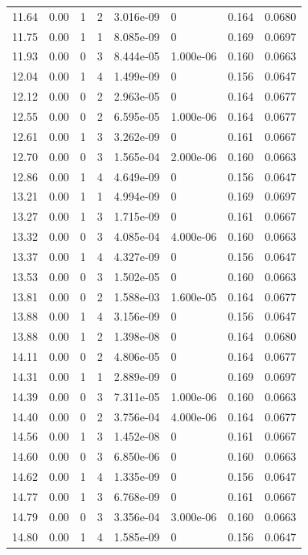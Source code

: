 \documentclass[preview]{standalone}
\begin{document}
{{{\begin{tabular}{L{1.2cm}C{1.2cm} C{0.3cm}C{0.5cm} C{1.4cm}C{1.4cm} C{1.4cm}C{1.4cm}}
  11.64  &  0.00  & 1     &  2 &  3.016e-09  & 0  & 0.164 &  0.0680   \\ 
  11.75  &  0.00  & 1     &  1 &  8.085e-09  & 0  & 0.169 &  0.0697   \\ 
  11.93  &  0.00  & 0     &  3 &  8.444e-05  & 1.000e-06  & 0.160 &  0.0663   \\ 
  12.04  &  0.00  & 1     &  4 &  1.499e-09  & 0  & 0.156 &  0.0647   \\ 
  12.12  &  0.00  & 0     &  2 &  2.963e-05  & 0  & 0.164 &  0.0677   \\ 
  12.55  &  0.00  & 0     &  2 &  6.595e-05  & 1.000e-06  & 0.164 &  0.0677   \\ 
  12.61  &  0.00  & 1     &  3 &  3.262e-09  & 0  & 0.161 &  0.0667   \\ 
  12.70  &  0.00  & 0     &  3 &  1.565e-04  & 2.000e-06  & 0.160 &  0.0663   \\ 
  12.86  &  0.00  & 1     &  4 &  4.649e-09  & 0  & 0.156 &  0.0647   \\ 
  13.21  &  0.00  & 1     &  1 &  4.994e-09  & 0  & 0.169 &  0.0697   \\ 
  13.27  &  0.00  & 1     &  3 &  1.715e-09  & 0  & 0.161 &  0.0667   \\ 
  13.32  &  0.00  & 0     &  3 &  4.085e-04  & 4.000e-06  & 0.160 &  0.0663   \\ 
  13.37  &  0.00  & 1     &  4 &  4.327e-09  & 0  & 0.156 &  0.0647   \\ 
  13.53  &  0.00  & 0     &  3 &  1.502e-05  & 0  & 0.160 &  0.0663   \\ 
  13.81  &  0.00  & 0     &  2 &  1.588e-03  & 1.600e-05  & 0.164 &  0.0677   \\ 
  13.88  &  0.00  & 1     &  4 &  3.156e-09  & 0  & 0.156 &  0.0647   \\ 
  13.88  &  0.00  & 1     &  2 &  1.398e-08  & 0  & 0.164 &  0.0680   \\ 
  14.11  &  0.00  & 0     &  2 &  4.806e-05  & 0  & 0.164 &  0.0677   \\ 
  14.31  &  0.00  & 1     &  1 &  2.889e-09  & 0  & 0.169 &  0.0697   \\ 
  14.39  &  0.00  & 0     &  3 &  7.311e-05  & 1.000e-06  & 0.160 &  0.0663   \\ 
  14.40  &  0.00  & 0     &  2 &  3.756e-04  & 4.000e-06  & 0.164 &  0.0677   \\ 
  14.56  &  0.00  & 1     &  3 &  1.452e-08  & 0  & 0.161 &  0.0667   \\ 
  14.60  &  0.00  & 0     &  3 &  6.850e-06  & 0  & 0.160 &  0.0663   \\ 
  14.62  &  0.00  & 1     &  4 &  1.335e-09  & 0  & 0.156 &  0.0647   \\ 
  14.77  &  0.00  & 1     &  3 &  6.768e-09  & 0  & 0.161 &  0.0667   \\ 
  14.79  &  0.00  & 0     &  3 &  3.356e-04  & 3.000e-06  & 0.160 &  0.0663   \\ 
  14.80  &  0.00  & 1     &  4 &  1.585e-09  & 0  & 0.156 &  0.0647   \\ 
\hline 
\end{tabular} 

}}}
\end{document}
